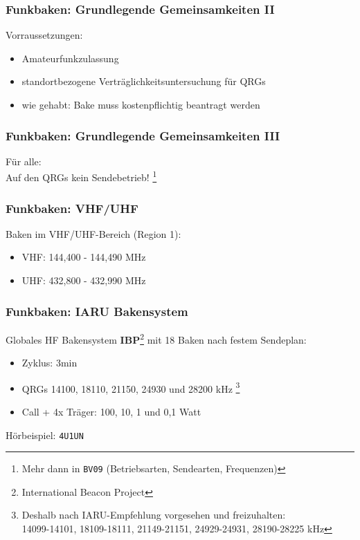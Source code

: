 \begin{frame}
  \frametitle{Funkbaken: Grundlegende Gemeinsamkeiten II}

  Vorraussetzungen:

  \begin{itemize}
    \item Amateurfunkzulassung
    \item standortbezogene Verträglichkeitsuntersuchung für QRGs
    \item wie gehabt: Bake muss kostenpflichtig beantragt werden
  \end{itemize}

\end{frame}

\begin{frame}
  \frametitle{Funkbaken: Grundlegende Gemeinsamkeiten III}

  \begin{center}
    Für alle: \\[2em]
    \Large Auf den QRGs kein Sendebetrieb!
    \footnote{Mehr dann in \texttt{BV09} (Betriebsarten, Sendearten, Frequenzen)}
  \end{center}

\end{frame}

\begin{frame}
  \frametitle{Funkbaken: VHF/UHF}

  Baken im VHF/UHF-Bereich (Region 1):

  \begin{itemize}
    \item VHF: 144,400 - 144,490 MHz
    \item UHF: 432,800 - 432,990 MHz
  \end{itemize}

\end{frame}

\begin{frame}
  \frametitle{Funkbaken: IARU Bakensystem}

  Globales HF Bakensystem \textbf{IBP}\footnote{International Beacon Project}
  mit 18 Baken nach festem Sendeplan:

  \begin{itemize}
    \item Zyklus: 3min
    \item QRGs 14100, 18110, 21150, 24930 und 28200 kHz
      \footnote{Deshalb nach IARU-Empfehlung vorgesehen und freizuhalten: \\
      \scriptsize 14099-14101, 18109-18111, 21149-21151, 24929-24931, 28190-28225 kHz}
    \item Call + 4x Träger: 100, 10, 1 und 0,1 Watt
  \end{itemize}

  \begin{center}
    Hörbeispiel: \Large \texttt{4U1UN} \hyperlink{refs}{\cite{ibp}}
  \end{center}

\end{frame}


